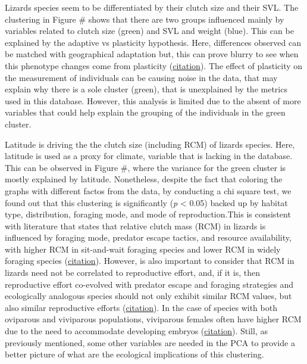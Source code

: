 \documentclass[
]{article}
\begin{document}
Lizards species seem to be differentiated by their clutch size and their
SVL. The clustering in Figure \# shows that there are two groups
influenced mainly by variables related to clutch size (green) and SVL
and weight (blue). This can be explained by the adaptive vs plasticity
hypothesis. Here, differences observed can be matched with geographical
adaptation but, this can prove blurry to see when this phenotype changes
come from plasticity
(\href{https://link.springer.com/article/10.1007/s11692-013-9247-2}{citation}).
The effect of plasticity on the measurement of individuals can be
causing noise in the data, that may explain why there is a sole cluster
(green), that is unexplained by the metrics used in this database.
However, this analysis is limited due to the absent of more variables
that could help explain the grouping of the individuals in the green
cluster.

Latitude is driving the the clutch size (including RCM) of lizards
species. Here, latitude is used as a proxy for climate, variable that is
lacking in the database. This can be observed in Figure \#, where the
variance for the green cluster is mostly explained by latitude.
Nonetheless, despite the fact that coloring the graphs with different
factos from the data, by conducting a chi square test, we found out that
this clustering is significantly (\emph{p} \textless{} 0.05) backed up
by habitat type, distribution, foraging mode, and mode of
reproduction.This is consistent with literature that states that
relative clutch mass (RCM) in lizards is influenced by foraging mode,
predator escape tactics, and resource availability, with higher RCM in
sit-and-wait foraging species and lower RCM in widely foraging species
(\href{https://www.notion.so/ECOLOGICAL-AND-EVOLUTIONARY-DETERMINANTS-OF-RELATIVE-CLUTCH-MASS-IN-LIZARDS-Semantic-Scholar-16bfcf8b78b080e4a4c1d8f684686178?pvs=21}{citation}).
However, is also important to consider that RCM in lizards need not be
correlated to reproductive effort, and, if it is, then reproductive
effort co-evolved with predator escape and foraging strategies and
ecologically analogous species should not only exhibit similar RCM
values, but also similar reproductive efforts
(\href{https://www.notion.so/Body-Shape-Reproductive-Effort-and-Relative-Clutch-Mass-in-Lizards-Resolution-of-a-Paradox-Sema-16bfcf8b78b0804094ccf40336e02277?pvs=21}{citation}).
In the case of species with both oviparous and viviparous populations,
viviparous females often have higher RCM due to the need to accommodate
developing embryos
(\href{https://www.notion.so/Maternal-body-volume-as-a-constraint-on-reproductive-output-in-lizards-evidence-from-the-evolution--16bfcf8b78b080c5bdf3f61c4fd06758?pvs=21}{citation}).
Still, as previously mentioned, some other variables are needed in the
PCA to provide a better picture of what are the ecological implications
of this clustering.
\end{document}

